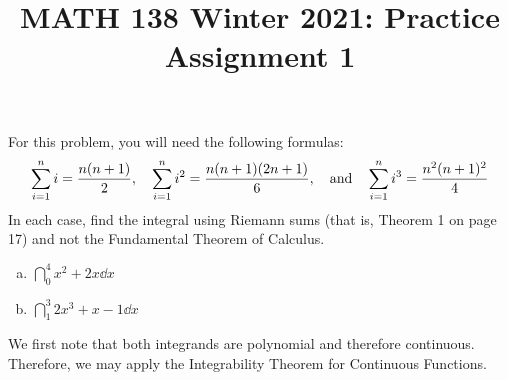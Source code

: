 \documentclass{agony}
\title{MATH 138 Winter 2021: Practice Assignment 1}
\begin{document}
\begin{prob}
  For this problem, you will need the following formulas:
  \begin{equation*}
    \sum_{i=1}^n i = \frac{n(n+1)}{2}\qc
    \sum_{i=1}^n i^2 = \frac{n(n+1)(2n+1)}{6},\qq{and}
    \sum_{i=1}^n i^3 = \frac{n^2(n+1)^2}{4}
  \end{equation*}
  In each case, find the integral using Riemann sums (that is, Theorem 1 on page 17)
  and not the Fundamental Theorem of Calculus.
  \begin{enumerate}[(a)]
    \item $\dint_0^4 x^2 + 2x \dd{x}$
    \item $\dint_1^3 2x^3 + x - 1 \dd{x}$
  \end{enumerate}
\end{prob}
\begin{sol}
  We first note that both integrands are polynomial and therefore continuous.
  Therefore, we may apply the Integrability Theorem for Continuous Functions.


\end{sol}
\end{document}
